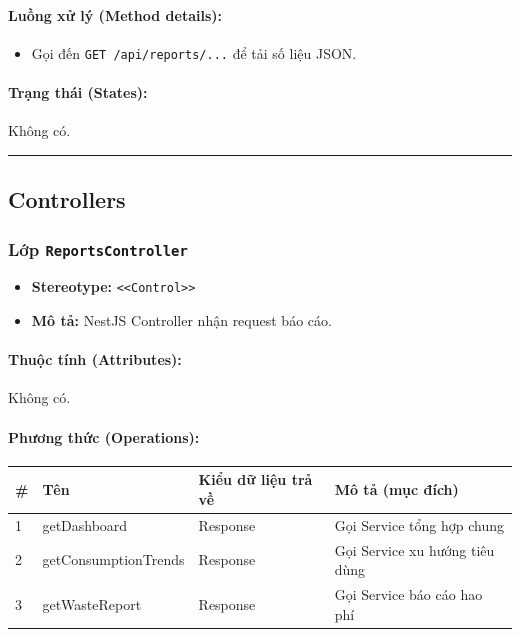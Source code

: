 \documentclass[12pt,a4paper]{article}
\begin{document}
\paragraph{Luồng xử lý (Method details):}
\begin{itemize}[leftmargin=*]
    \item Gọi đến \texttt{GET /api/reports/...} để tải số liệu JSON.
\end{itemize}


\paragraph{Trạng thái (States):}
Không có.

\vskip 0.5cm
\noindent\rule{\textwidth}{0.5pt}
\vskip 0.5cm

\subsection{Controllers}


\subsubsection{Lớp \texttt{ReportsController}}

\begin{itemize}[leftmargin=*]
    \item \textbf{Stereotype:} \texttt{\textless{}\textless{}Control\textgreater{}\textgreater{}}
    \item \textbf{Mô tả:} NestJS Controller nhận request báo cáo.
\end{itemize}

\paragraph{Thuộc tính (Attributes):}
Không có.

\paragraph{Phương thức (Operations):}
\begin{longtable}{|p{0.6cm}|p{5.0cm}|p{2.8cm}|p{5.4cm}|}
\hline
\textbf{\#} & \textbf{Tên} & \textbf{Kiểu dữ liệu trả về} & \textbf{Mô tả (mục đích)} \\ \hline
\endhead
1 & getDashboard & Response & Gọi Service tổng hợp chung \\ \hline
2 & getConsumptionTrends & Response & Gọi Service xu hướng tiêu dùng \\ \hline
3 & getWasteReport & Response & Gọi Service báo cáo hao phí \\ \hline
\end{longtable}
\end{document}
